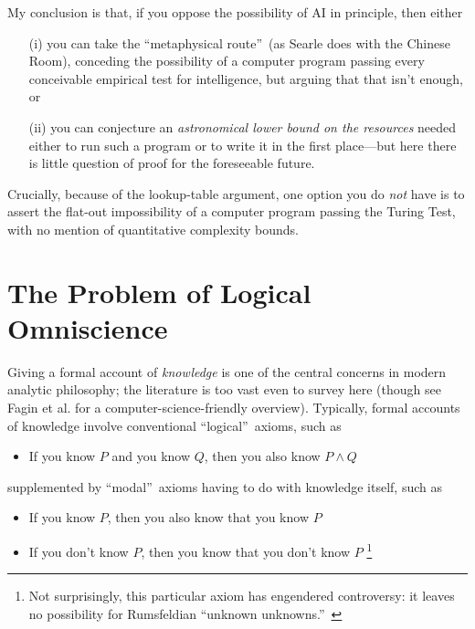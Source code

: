 \documentclass[12pt,onecolumn]{article}%
\begin{document}
My conclusion is that, if you oppose the possibility of AI in principle, then either

\begin{enumerate}
\item[(i)] you can take the \textquotedblleft metaphysical
route\textquotedblright\  (as Searle \cite{searle} does with the Chinese
Room), conceding the possibility of a computer program passing every
conceivable empirical test for intelligence, but arguing that that isn't
enough, or

\item[(ii)] you can conjecture an \textit{astronomical lower bound on the
resources} needed either to run such a program or to write it in the first
place---but here there is little question of proof for the foreseeable future.
\end{enumerate}

\noindent Crucially, because of the lookup-table argument, one option you do
\textit{not} have is to assert the flat-out impossibility of a computer
program passing the Turing Test, with no mention of quantitative complexity bounds.

\section{The Problem of Logical Omniscience\label{OMNI}}

Giving a formal account of \textit{knowledge} is one of the central concerns
in modern analytic philosophy; the literature is too vast even to survey here
(though see Fagin et al. \cite{fhmv} for a computer-science-friendly
overview). Typically, formal accounts of knowledge involve conventional
\textquotedblleft logical\textquotedblright\  axioms, such as

\begin{itemize}
\item If you know $P$ and you know $Q$, then you also know $P\wedge Q$
\end{itemize}

\noindent supplemented by \textquotedblleft modal\textquotedblright\  axioms
having to do with knowledge itself, such as

\begin{itemize}
\item If you know $P$, then you also know that you know $P$

\item If you don't know $P$, then you know that you don't know $P$%
\footnote{Not surprisingly, this particular axiom has engendered controversy:
it leaves no possibility for Rumsfeldian \textquotedblleft unknown
unknowns.\textquotedblright\ }
\end{itemize}
\end{document}
